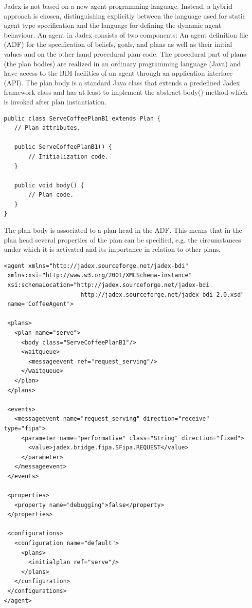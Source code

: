 Jadex is not based on a new agent programming language. Instead, a hybrid approach is chosen, distinguishing explicitly between the language used for static agent type specification and the language for defining the dynamic agent behaviour. An agent in Jadex consists of two components: An agent definition file (ADF) for the specification of beliefs, goals, and plans as well as their initial values and on the other hand procedural plan code. The procedural part of plans  (the plan bodies) are realized in an ordinary programming language (Java) and have access to the BDI facilities of an agent through an application interface (API). The plan body is a standard Java class that extends a predefined Jadex framework class and has at least to implement the abstract body() method which is invoked after plan instantiation.
\begin{lstlisting}
public class ServeCoffeePlanB1 extends Plan {
   // Plan attributes.

   public ServeCoffeePlanB1() {
       // Initialization code.
   }

   public void body() {
       // Plan code.
   }
}
\end{lstlisting} 
 The plan body is associated to a plan head in the ADF. This means that in the plan head several properties of the plan can be specified, e.g. the circumstances under which it is activated and its importance in relation to other plans.
\begin{lstlisting}
<agent xmlns="http://jadex.sourceforge.net/jadex-bdi"
 xmlns:xsi="http://www.w3.org/2001/XMLSchema-instance"
 xsi:schemaLocation="http://jadex.sourceforge.net/jadex-bdi
                      http://jadex.sourceforge.net/jadex-bdi-2.0.xsd"
 name="CoffeeAgent">

 <plans>
   <plan name="serve">
     <body class="ServeCoffeePlanB1"/>
     <waitqueue>
       <messageevent ref="request_serving"/>
     </waitqueue>
   </plan>
 </plans>

 <events>
   <messageevent name="request_serving" direction="receive" type="fipa">
     <parameter name="performative" class="String" direction="fixed">
       <value>jadex.bridge.fipa.SFipa.REQUEST</value>
     </parameter>
   </messageevent>
 </events>

 <properties>
   <property name="debugging">false</property>
 </properties>

 <configurations>
   <configuration name="default">
     <plans>
       <initialplan ref="serve"/>
     </plans>
   </configuration>
 </configurations>
</agent>
\end{lstlisting}
